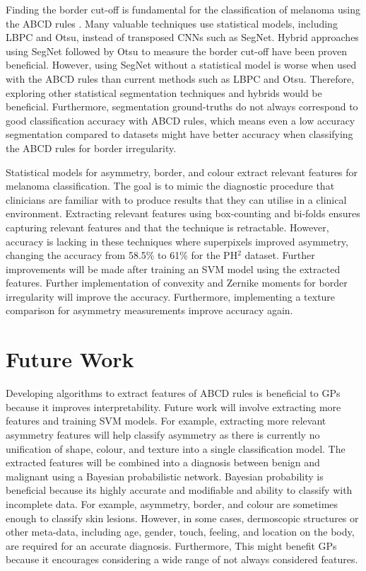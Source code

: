 \documentclass[10.5pt]{report}
\begin{document}
Finding the border cut-off is fundamental for the classification of melanoma using the ABCD rules \cite{Pereira2020}. Many valuable techniques use statistical models, including LBPC and Otsu, instead of transposed CNNs such as SegNet. Hybrid approaches using SegNet followed by Otsu to measure the border cut-off have been proven beneficial. However, using SegNet without a statistical model is worse when used with the ABCD rules than current methods such as LBPC and Otsu. Therefore, exploring other statistical segmentation techniques and hybrids would be beneficial. Furthermore, segmentation ground-truths do not always correspond to good classification accuracy with ABCD rules, which means even a low accuracy segmentation compared to datasets might have better accuracy when classifying the ABCD rules for border irregularity.

Statistical models for asymmetry, border, and colour extract relevant features for melanoma classification. The goal is to mimic the diagnostic procedure that clinicians are familiar with to produce results that they can utilise in a clinical environment. Extracting relevant features using box-counting and bi-folds ensures capturing relevant features and that the technique is retractable. However, accuracy is lacking in these techniques where superpixels improved asymmetry, changing the accuracy from 58.5\% to 61\% for the PH$^2$ dataset. Further improvements will be made after training an SVM model using the extracted features. Further implementation of convexity and Zernike moments for border irregularity will improve the accuracy. Furthermore, implementing a texture comparison for asymmetry measurements improve accuracy again.

\chapter{Future Work}
Developing algorithms to extract features of ABCD rules is beneficial to GPs because it improves interpretability. Future work will involve extracting more features and training SVM models. For example, extracting more relevant asymmetry features will help classify asymmetry as there is currently no unification of shape, colour, and texture into a single classification model. The extracted features will be combined into a diagnosis between benign and malignant using a Bayesian probabilistic network. Bayesian probability is beneficial because its highly accurate \cite{Takruri2017} and modifiable and ability to classify with incomplete data. For example, asymmetry, border, and colour are sometimes enough to classify skin lesions. However, in some cases, dermoscopic structures or other meta-data, including age, gender, touch, feeling, and location on the body, are required for an accurate diagnosis. Furthermore, This might benefit GPs because it encourages considering a wide range of not always considered features.
\end{document}
